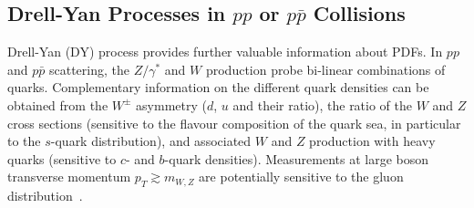 %




\subsection{Drell-Yan Processes in $pp$ or $p\bar p$ Collisions}
\label{dysection}

Drell-Yan (DY) process
provides further valuable information about PDFs.
In $pp$ and $p\bar p$ scattering, the $Z/\gamma^*$ and $W$ production 
probe bi-linear combinations of quarks. 
Complementary information on the different quark densities
can be obtained from the $W^{\pm}$ asymmetry ($d$, $u$ and their ratio),
the ratio of the $W$ and $Z$ cross sections (sensitive to the flavour 
composition of the quark sea, in particular to the $s$-quark distribution), 
and associated $W$ and $Z$ production with
heavy quarks (sensitive to $c$- and $b$-quark densities).
 Measurements at large boson transverse momentum $p_T\gtrsim m_{W,Z}$ are potentially sensitive to the gluon 
distribution~\cite{Malik:2013kba}.
%

